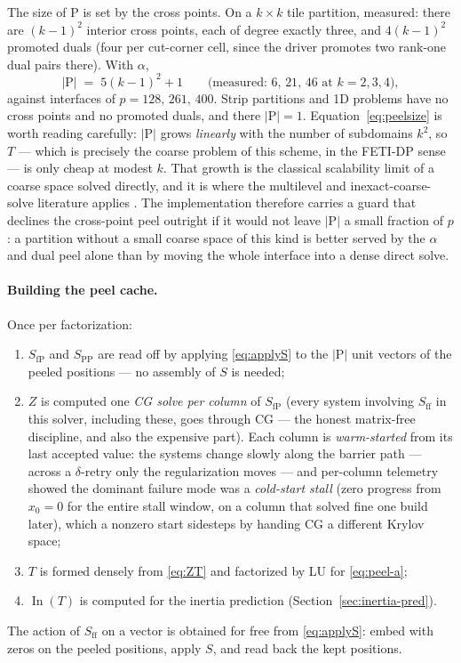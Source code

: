 \documentclass[11pt]{article}
\newcommand{\In}{\operatorname{In}}
\newcommand{\Sff}{S_{\mathrm{ff}}}
\newcommand{\SfP}{S_{\mathrm{fP}}}
\newcommand{\SPP}{S_{\mathrm{PP}}}
\begin{document}
The size of $\mathrm P$ is set by the cross points.  On a $k\times k$ tile
partition, measured: there are $(k-1)^2$ interior cross points, each of degree
exactly three, and $4(k-1)^2$ promoted duals (four per cut-corner cell, since
the driver promotes two rank-one dual pairs there).  With $\alpha$,
\begin{equation}
  |\mathrm P| \;=\; 5(k-1)^2 + 1
  \qquad\text{(measured: } 6,\,21,\,46 \text{ at } k=2,3,4\text{)},
  \label{eq:peelsize}
\end{equation}
against interfaces of $p = 128,\,261,\,400$.  Strip partitions and 1D problems
have no cross points and no promoted duals, and there $|\mathrm P| = 1$.
Equation~\eqref{eq:peelsize} is worth reading carefully: $|\mathrm P|$ grows
\emph{linearly} with the number of subdomains $k^2$, so $T$ --- which is
precisely the coarse problem of this scheme, in the FETI-DP sense --- is only
cheap at modest $k$.  That growth is the classical scalability limit of a
coarse space solved directly, and it is where the multilevel and
inexact-coarse-solve literature applies
\cite{klawonn2007inexact,tu2007three}.  The implementation therefore carries a
guard that declines the cross-point peel outright if it would not leave
$|\mathrm P|$ a small fraction of $p$: a partition without a small coarse
space of this kind is better served by the $\alpha$ and dual peel alone than
by moving the whole interface into a dense direct solve.

\paragraph{Building the peel cache.}  Once per factorization:
\begin{enumerate}
\item $\SfP$ and $\SPP$ are read off by applying \eqref{eq:applyS} to the
  $|\mathrm P|$ unit vectors of the peeled positions --- no assembly of $S$
  is needed;
\item $Z$ is computed one \emph{CG solve per column} of $\SfP$ (every system
  involving $\Sff$ in this solver, including these, goes through CG --- the
  honest matrix-free discipline, and also the expensive part).  Each column
  is \emph{warm-started} from its last accepted value: the systems change
  slowly along the barrier path --- across a $\delta$-retry only the
  regularization moves --- and per-column telemetry showed the dominant
  failure mode was a \emph{cold-start stall} (zero progress from $x_0=0$ for
  the entire stall window, on a column that solved fine one build later), 
  which a nonzero start sidesteps by handing CG a different Krylov space;
\item $T$ is formed densely from \eqref{eq:ZT} and factorized by LU for
  \eqref{eq:peel-a};
\item $\In(T)$ is computed for the inertia prediction
  (Section~\ref{sec:inertia-pred}).
\end{enumerate}
The action of $\Sff$ on a vector is obtained for free from
\eqref{eq:applyS}: embed with zeros on the peeled positions, apply $S$, and
read back the kept positions.
\end{document}
